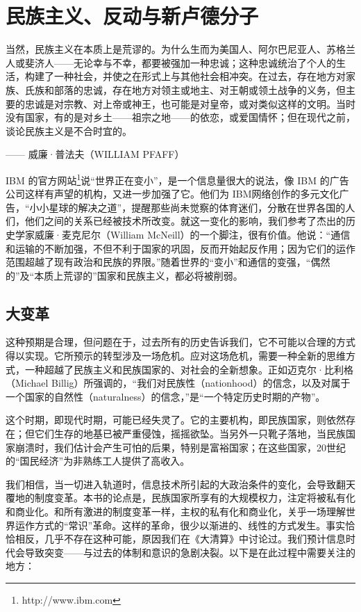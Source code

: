 \chapter{民族主义、反动与新卢德分子}

\begin{tcolorbox}
当然，民族主义在本质上是荒谬的。为什么生而为美国人、阿尔巴尼亚人、苏格兰人或斐济人——无论幸与不幸，都要被强加一种忠诚；这种忠诚统治了个人的生活，构建了一种社会，并使之在形式上与其他社会相冲突。在过去，存在地方对家族、氏族和部落的忠诚，存在地方对领主或地主、对王朝或领土战争的义务，但主要的忠诚是对宗教、对上帝或神王，也可能是对皇帝，或对类似这样的文明。当时没有国家，有的是对乡土——祖宗之地——的依恋，或爱国情怀；但在现代之前，谈论民族主义是不合时宜的。
\begin{flushright}
—— 威廉·普法夫（WILLIAM PFAFF）
\end{flushright}
\end{tcolorbox}

IBM 的官方网站\footnote{http://www.ibm.com}说“世界正在变小”，是一个信息量很大的说法，像 IBM 的广告公司这样有声望的机构，又进一步加强了它。他们为 IBM网络创作的多元文化广告，“小小星球的解决之道”，提醒那些尚未觉察的体育迷们，分散在世界各国的人们，他们之间的关系已经被技术所改变。就这一变化的影响，我们参考了杰出的历史学家威廉·麦克尼尔（William McNeill）的一个脚注，很有价值。他说：“通信和运输的不断加强，不但不利于国家的巩固，反而开始起反作用；因为它们的运作范围超越了现有政治和民族的界限。”随着世界的“变小”和通信的变强，“偶然的”及“本质上荒谬的”国家和民族主义，都必将被削弱。

\section{大变革}
这种预期是合理，但问题在于，过去所有的历史告诉我们，它不可能以合理的方式得以实现。它所预示的转型涉及一场危机。应对这场危机，需要一种全新的思维方式，一种超越了民族主义和民族国家的、对社会的全新想象。正如迈克尔·比利格（Michael Billig）所强调的，“我们对民族性（nationhood）的信念，以及对属于一个国家的自然性（naturalness）的信念，”是“一个特定历史时期的产物”。

这个时期，即现代时期，可能已经失灵了。它的主要机构，即民族国家，则依然存在；但它们生存的地基已被严重侵蚀，摇摇欲坠。当另外一只靴子落地，当民族国家崩溃时，我们估计会产生可怕的后果，特别是富裕国家；在这些国家，20世纪的“国民经济”为非熟练工人提供了高收入。

我们相信，当一切进入轨道时，信息技术所引起的大政治条件的变化，会导致翻天覆地的制度变革。本书的论点是，民族国家所享有的大规模权力，注定将被私有化和商业化。和所有激进的制度变革一样，主权的私有化和商业化，关乎一场理解世界运作方式的“常识”革命。这样的革命，很少以渐进的、线性的方式发生。事实恰恰相反，几乎不存在这种可能，原因我们在《大清算》中讨论过。我们预计信息时代会导致突变——与过去的体制和意识的急剧决裂。以下是在此过程中需要关注的地方：

